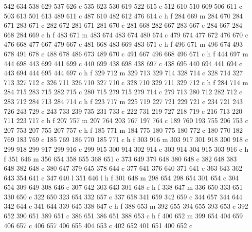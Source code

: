 {{        542 634 538 629 537 626 c
        535 623 530 619 522 615 c
        512 610 510 609 506 611 c
        503 613 501 613 489 611 c
        487 610 482 612 476 614 c
        h f
        284 669 m
        284 670 284 671 283 671 c
        282 672 281 671 281 670 c
        281 668 282 667 283 667 c
        284 667 284 668 284 669 c
        h f
        483 671 m
        483 674 483 674 480 674 c
        479 674 477 672 476 670 c
        476 668 477 667 479 667 c
        481 668 483 669 483 671 c
        h f
        496 671 m
        496 674 493 678 491 678 c
        488 678 486 673 489 670 c
        491 667 496 668 496 671 c
        h f
        444 697 m
        444 698 443 699 441 699 c
        440 699 438 698 438 697 c
        438 695 440 694 441 694 c
        443 694 444 695 444 697 c
        h f
        329 712 m
        329 713 329 714 328 714 c
        328 714 327 713 327 712 c
        326 711 326 710 327 710 c
        328 710 329 711 329 712 c
        h f
        284 714 m
        284 715 283 715 282 715 c
        280 715 279 715 279 714 c
        279 713 280 712 282 712 c
        283 712 284 713 284 714 c
        h f
        223 717 m
        225 719 227 721 229 721 c
        234 721 243 726 243 729 c
        243 733 239 735 231 733 c
        222 731 219 727 218 719 c
        216 713 220 711 223 717 c
        h f
        207 757 m
        207 764 203 767 197 764 c
        189 760 193 755 206 753 c
        207 753 207 755 207 757 c
        h f
        185 771 m
        184 775 180 775 180 772 c
        180 770 182 769 183 769 c
        185 769 186 770 185 771 c
        h f
        303 916 m
        303 917 301 918 300 918 c
        299 918 299 917 299 916 c
        299 915 300 914 302 914 c
        303 914 304 915 303 916 c
        h f
        351 646 m
        356 654 358 655 368 651 c
        373 649 379 648 380 648 c
        382 648 383 648 382 648 c
        380 647 379 645 378 644 c
        377 641 376 640 371 641 c
        363 643 362 643 354 641 c
        347 640 l
        351 646 l
        h f
        301 648 m
        298 654 298 654 301 654 c
        304 654 309 649 308 646 c
        307 642 303 643 301 648 c
        h f
        338 647 m
        336 650 333 651 330 650 c
        322 650 323 654 332 657 c
        337 658 341 659 342 659 c
        344 657 344 644 342 644 c
        341 644 339 645 338 647 c
        h f
        388 653 m
        392 655 394 655 393 653 c
        392 652 390 651 389 651 c
        386 651 386 651 388 653 c
        h f
        400 652 m
        399 654 404 659 406 657 c
        406 657 406 655 404 653 c
        402 652 401 651 400 652 c
}}
